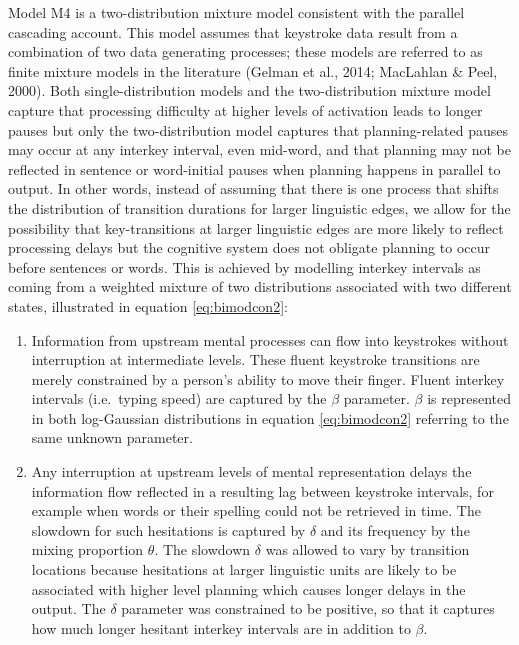 \documentclass[
  man,floatsintext]{apa7}
\begin{document}
Model M4 is a two-distribution mixture model consistent with the parallel cascading account. This model assumes that keystroke data result from a combination of two data generating processes; these models are referred to as finite mixture models in the literature (Gelman et al., 2014; MacLahlan \& Peel, 2000). Both single-distribution models and the two-distribution mixture model capture that processing difficulty at higher levels of activation leads to longer pauses but only the two-distribution model captures that planning-related pauses may occur at any interkey interval, even mid-word, and that planning may not be reflected in sentence or word-initial pauses when planning happens in parallel to output. In other words, instead of assuming that there is one process that shifts the distribution of transition durations for larger linguistic edges, we allow for the possibility that key-transitions at larger linguistic edges are more likely to reflect processing delays but the cognitive system does not obligate planning to occur before sentences or words. This is achieved by modelling interkey intervals as coming from a weighted mixture of two distributions associated with two different states, illustrated in equation \ref{eq:bimodcon2}:

\begin{enumerate}
\def\labelenumi{\arabic{enumi}.}
\item
  Information from upstream mental processes can flow into keystrokes without interruption at intermediate levels. These fluent keystroke transitions are merely constrained by a person's ability to move their finger. Fluent interkey intervals (i.e.~typing speed) are captured by the \(\beta\) parameter. \(\beta\) is represented in both log-Gaussian distributions in equation \ref{eq:bimodcon2} referring to the same unknown parameter.
\item
  Any interruption at upstream levels of mental representation delays the information flow reflected in a resulting lag between keystroke intervals, for example when words or their spelling could not be retrieved in time. The slowdown for such hesitations is captured by \(\delta\) and its frequency by the mixing proportion \(\theta\). The slowdown \(\delta\) was allowed to vary by transition locations because hesitations at larger linguistic units are likely to be associated with higher level planning which causes longer delays in the output. The \(\delta\) parameter was constrained to be positive, so that it captures how much longer hesitant interkey intervals are in addition to \(\beta\).
\end{enumerate}
\end{document}
